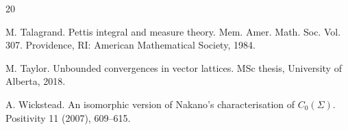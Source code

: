 \documentclass{amsart}
\theoremstyle{plain}
\theoremstyle{definition}
\numberwithin{equation}{section}
\begin{document}
\begin{thebibliography}{20}


 M. Talagrand. Pettis integral and measure theory. Mem. Amer. Math. Soc. Vol. 307. Providence, RI: American Mathematical Society, 1984.

 M. Taylor.
Unbounded convergences in vector lattices. MSc thesis, University of Alberta, 2018.

 A. Wickstead.
An isomorphic version of Nakano's characterisation of $C_0(\Sigma)$.
Positivity  11 (2007), 609--615.


\end{thebibliography}
\end{document}
